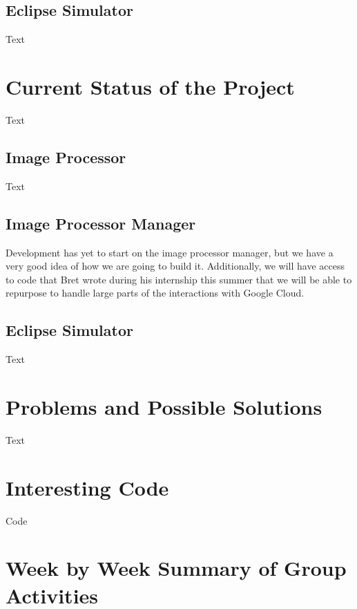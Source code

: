 \documentclass[10pt, onecolumn, draftclsnofoot, letterpaper, compsoc]{IEEEtran}
\begin{document}
\subsection{Eclipse Simulator}

Text


\section{Current Status of the Project}

Text

\subsection{Image Processor}

Text

\subsection{Image Processor Manager}

Development has yet to start on the image processor manager, but we have a very good idea of how we 
are going to build it. Additionally, we will have access to code that Bret wrote during his internship 
this summer that we will be able to repurpose to handle large parts of the interactions with Google Cloud.

\subsection{Eclipse Simulator}

Text

\section{Problems and Possible Solutions}

Text

\section{Interesting Code}

Code

\section{Week by Week Summary of Group Activities}
\end{document}
